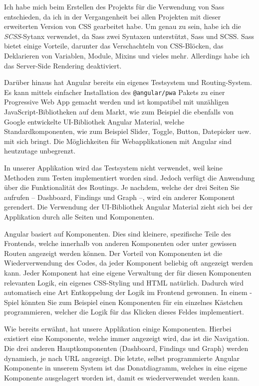 Ich habe mich beim Erstellen des Projekts für die Verwendung von Sass entschieden, da ich in der Vergangenheit bei allen Projekten mit dieser erweiterten Version von CSS gearbeitet habe. Um genau zu sein, habe ich die \emph{SCSS}-Sytanx verwendet, da Sass zwei Syntaxen unterstützt, Sass und SCSS. Sass bietet einige Vorteile, darunter das Verschachteln von CSS-Blöcken, das Deklarieren von Variablen, Module, Mixins und vieles mehr. Allerdings habe ich das Server-Side Rendering deaktiviert. \cite{Sass}

Darüber hinaus hat Angular bereits ein eigenes Testsystem und Routing-System. Es kann mittels einfacher Installation des \texttt{@angular/pwa} Pakets zu einer Progressive Web App gemacht werden und ist kompatibel mit unzähligen JavaScript-Bibliotheken auf dem Markt, wie zum Beispiel die ebenfalls von Google entwickelte UI-Bibliothek Angular Material, welche Standardkomponenten, wie zum Beispiel Slider, Toggle, Button, Datepicker usw. mit sich bringt. Die Möglichkeiten für Webapplikationen mit Angular sind heutzutage unbegrenzt. \cite{AngularTesting,AngularRouting,AngularMaterial}

In unserer Applikation wird das Testsystem nicht verwendet, weil keine Methoden zum Testen implementiert worden sind. Jedoch verfügt die Anwendung über die Funktionalität des Routings. Je nachdem, welche der drei Seiten Sie aufrufen -- Dashboard, Findings und Graph --, wird ein anderer Komponent gerendert. Die Verwendung der UI-Bibliothek Angular Material zieht sich bei der Applikation durch alle Seiten und Komponenten. \cite{AngularTesting,AngularRouting,AngularMaterial}

Angular basiert auf Komponenten. Dies sind kleinere, spezifische Teile des Frontends, welche innerhalb von anderen Komponenten oder unter gewissen Routen angezeigt werden können. Der Vorteil von Komponenten ist die Wiederverwendung des Codes, da jeder Komponent beliebig oft angezeigt werden kann. Jeder Komponent hat eine eigene Verwaltung der für diesen Komponenten relevanten Logik, ein eigenes CSS-Styling und HTML natürlich. Dadurch wird automatisch eine Art Entkoppelung der Logik im Frontend gewonnen. In einem -Spiel könnten Sie zum Beispiel einen Komponenten für ein einzelnes Kästchen programmieren, welcher die Logik für das Klicken dieses Feldes implementiert. \cite{AngularRouting,AngularComponents}

Wie bereits erwähnt, hat unsere Applikation einige Komponenten. Hierbei existiert eine Komponente, welche immer angezeigt wird, das ist die Navigation. Die drei anderen Hauptkomponenten (Dashboard, Findings und Graph) werden dynamisch, je nach URL angezeigt. Die letzte, selbst programmierte Angular Komponente in unserem System ist das Donatdiagramm, welches in eine eigene Komponente ausgelagert worden ist, damit es wiederverwendet werden kann.

